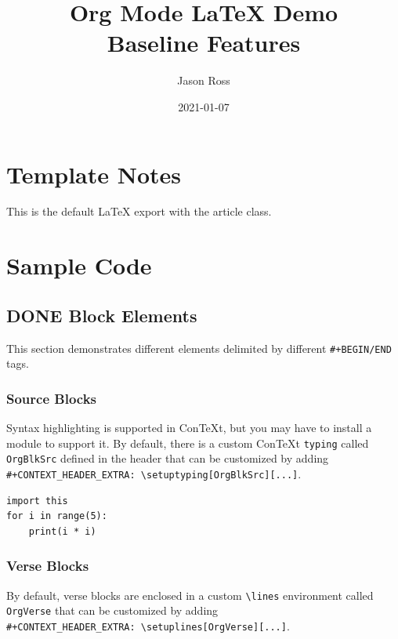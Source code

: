 \documentclass[11pt]{article}
\author{Jason Ross}
\date{2021-01-07}
\title{Org Mode \LaTeX{} Demo\\\medskip
\large Baseline Features}
\begin{document}
\maketitle
\tableofcontents


\section{Template Notes}
\label{sec:org4159871}
This is the default \LaTeX{} export with the article class.
\section{Sample Code}
\label{sec:org594f935}
\subsection{{\bfseries\sffamily DONE}  Block Elements}
\label{sec:org85b227c}
This section demonstrates different elements delimited by different
\texttt{\#+BEGIN/END} tags.
\subsubsection{Source Blocks}
\label{sec:org1e8c29e}
Syntax highlighting is supported in ConTeXt, but you may have to install a
module to support it. By default, there is a custom ConTeXt \texttt{typing} called
\texttt{OrgBlkSrc} defined in the header that can be customized by adding\\
\texttt{\#+CONTEXT\_HEADER\_EXTRA: \textbackslash{}setuptyping[OrgBlkSrc][...]}.
\begin{verbatim}
import this
for i in range(5):
    print(i * i)
\end{verbatim}
\subsubsection{Verse Blocks}
\label{sec:orgd3b33b7}
By default, verse blocks are enclosed in a custom \texttt{\textbackslash{}lines} environment called
\texttt{OrgVerse} that can be customized by adding\\
\texttt{\#+CONTEXT\_HEADER\_EXTRA: \textbackslash{}setuplines[OrgVerse][...]}.
\end{document}
